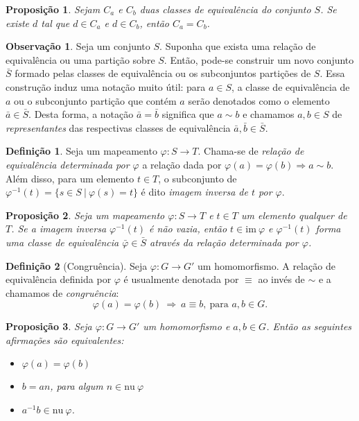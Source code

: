 \documentclass[a4paper,12pt]{report}
\theoremstyle{plain}
\newtheorem{proposicao}{Proposição}[section]
\theoremstyle{definition}
\newtheorem{definicao}{Definição}[section]
\newtheorem{observacao}{Observação}[section]
\begin{document}
\begin{proposicao}
	Sejam \(C_a\) e \(C_b\) duas classes de equivalência do conjunto \(S\). Se existe \(d\) tal que \(d\in C_a\) e \(d\in C_b\), então \(C_a = C_b\).
\end{proposicao}

\begin{observacao}
	Seja um conjunto \(S\). Suponha que exista uma relação de equivalência
	ou uma partição sobre \(S\). Então, pode-se construir um novo conjunto
	\(\bar{S}\) formado pelas classes de equivalência ou os subconjuntos
	partições de \(S\). Essa construção induz uma notação muito útil: para
	\(a\in S\), a classe de equivalência de \(a\) ou o subconjunto partição
	que contém \(a\) serão denotados como o elemento
	\(\bar{a} \in \bar{S}\). Desta forma, a notação \(\bar{a} = \bar{b}\)
	significa que \(a \sim b\) e chamamos \(a,b \in S\) de
	\emph{representantes} das respectivas classes de equivalência
	\(\bar{a}, \bar{b} \in \bar{S}\).
\end{observacao}

\begin{definicao}
	Seja um mapeamento \(\varphi: S \longrightarrow T\).
	Chama-se de \emph{relação de equivalência determinada por \(\varphi\)} a
	relação dada por \(\varphi(a) = \varphi(b) \Rightarrow a \sim b\). Além
	disso, para um elemento \(t\in T\), o subconjunto de
	\(\varphi^{-1}(t) = \{s \in S\ | \ \varphi(s) = t\}\) é dito
	\emph{imagem inversa de \(t\) por \(\varphi\)}.
\end{definicao}

\begin{proposicao}
	Seja um mapeamento \(\varphi: S \longrightarrow T\)
	e \(t \in T\) um elemento qualquer de \(T\). Se a imagem inversa
	\(\varphi^{-1}(t)\) é não vazia, então \(t \in \text{im}\ \varphi\) e
	\(\varphi^{-1}(t)\) forma uma classe de equivalência
	\(\bar{\varphi}\in \bar{S}\) através da relação determinada por
	\(\varphi\).	
\end{proposicao}

\begin{definicao}[Congruência]
	Seja \(\varphi: G\longrightarrow G'\) um
	homomorfismo. A relação de equivalência definida por \(\varphi\) é
	usualmente denotada por \(\equiv\) ao invés de \(\sim\) e a chamamos de
	\emph{congruência}:
	\[\varphi(a) = \varphi(b) \ \Rightarrow \ a \equiv b, \ \text{para }a,b \in G.\]	
\end{definicao}

\begin{proposicao}
	Seja \(\varphi: G\longrightarrow G'\) um
	homomorfismo e \(a,b \in G\). Então as seguintes afirmações são
	equivalentes:
	\begin{itemize}
		\item
		\(\varphi(a) = \varphi(b)\)
		\item
		\(b = an\), para algum \(n\in \text{nu} \ \varphi\)
		\item
		\(a^{-1}b \in \text{nu} \ \varphi\).
	\end{itemize}	
\end{proposicao}
\end{document}
